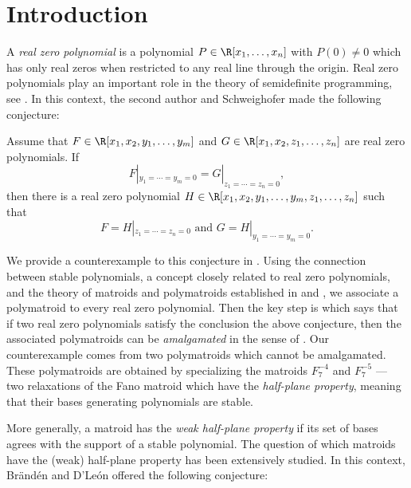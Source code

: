 \section{Introduction}
A \emph{real zero polynomial} is a polynomial $P\in\R[x_1,\ldots,x_n]$ with $P(0)\neq0$ which has only real zeros when restricted to any real line through the origin. Real zero polynomials play an important role in the theory of semidefinite programming, see \eg \cite{victorsurvey}. In this context, the second author and Schweighofer made the following conjecture:

\begin{con*}
    Assume that $F\in\R[x_1,x_2,y_1,\ldots,y_m]$ and $G\in\R[x_1,x_2,z_1,\ldots,z_n]$ are real zero polynomials. If
    \begin{equation*}
        F|_{y_1=\cdots=y_m=0}=G|_{z_1=\cdots=z_n=0},
    \end{equation*}
    then there is a real zero polynomial $H\in\R[x_1,x_2,y_1,\ldots,y_m,z_1,\ldots,z_n]$ such that
    \begin{equation*}
        F=H|_{z_1=\cdots=z_n=0}\textrm{ and }G=H|_{y_1=\cdots=y_m=0}.
    \end{equation*}
\end{con*}

We provide a counterexample to this conjecture in . Using the connection between stable polynomials, a concept closely related to real zero polynomials, and the theory of matroids and polymatroids established in \cite{HPPlong} and \cite{BrandenHPP}, we associate a polymatroid to every real zero polynomial. Then the key step is  which says that if two real zero polynomials satisfy the conclusion the above conjecture, then the associated polymatroids can be \emph{amalgamated} in the sense of . Our counterexample comes from two polymatroids which cannot be amalgamated. These polymatroids are obtained by specializing the matroids $F_7^{-4}$ and $F_7^{-5}$ --- two relaxations of the Fano matroid which have the \emph{half-plane property}, meaning that their bases generating polynomials are stable. 

More generally, a matroid has the \emph{weak half-plane property} if its set of bases agrees with the support of a stable polynomial. The question of which matroids have the (weak) half-plane property has been extensively studied. In this context, Br\"and\'en and D'Le\'on offered the following conjecture:

